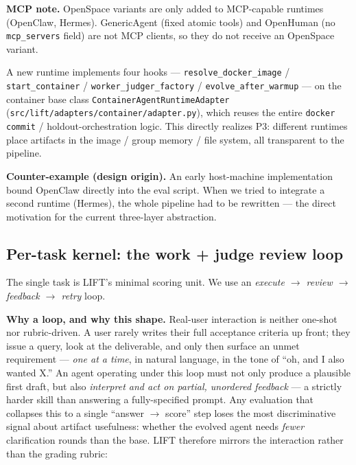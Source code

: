 \documentclass{article}
\begin{document}
\textbf{MCP note.} OpenSpace variants are only added to MCP-capable runtimes (OpenClaw, Hermes). GenericAgent (fixed atomic tools) and OpenHuman (no \texttt{mcp\_servers} field) are not MCP clients, so they do not receive an OpenSpace variant.

A new runtime implements four hooks --- \texttt{resolve\_docker\_image} / \texttt{start\_container} / \texttt{worker\_judger\_factory} / \texttt{evolve\_after\_warmup} --- on the container base class \texttt{ContainerAgentRuntimeAdapter} (\texttt{src/lift/adapters/container/adapter.py}), which reuses the entire \texttt{docker commit} / holdout-orchestration logic. This directly realizes P3: different runtimes place artifacts in the image / group memory / file system, all transparent to the pipeline.

\textbf{Counter-example (design origin).} An early host-machine implementation bound OpenClaw directly into the eval script. When we tried to integrate a second runtime (Hermes), the whole pipeline had to be rewritten --- the direct motivation for the current three-layer abstraction.

\subsection{Per-task kernel: the work + judge review loop}
\label{sec:work-judge-loop}

The single task is LIFT's minimal scoring unit. We use an \emph{execute $\rightarrow$ review $\rightarrow$ feedback $\rightarrow$ retry} loop.

\textbf{Why a loop, and why this shape.} Real-user interaction is neither one-shot nor rubric-driven. A user rarely writes their full acceptance criteria up front; they issue a query, look at the deliverable, and only then surface an unmet requirement --- \emph{one at a time}, in natural language, in the tone of ``oh, and I also wanted X.'' An agent operating under this loop must not only produce a plausible first draft, but also \emph{interpret and act on partial, unordered feedback} --- a strictly harder skill than answering a fully-specified prompt. Any evaluation that collapses this to a single ``answer $\rightarrow$ score'' step loses the most discriminative signal about artifact usefulness: whether the evolved agent needs \emph{fewer} clarification rounds than the base. LIFT therefore mirrors the interaction rather than the grading rubric:
\end{document}
